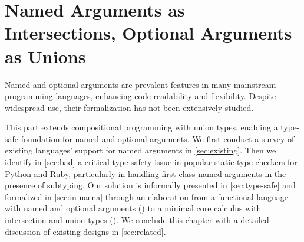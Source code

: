 \chapter{Named Arguments as Intersections, Optional Arguments as Unions} \label{ch:arguments}

Named and optional arguments are prevalent features in many mainstream
programming languages, enhancing code readability and flexibility. Despite
widespread use, their formalization has not been extensively studied.

This part extends compositional programming with union types, enabling a
type-safe foundation for named and optional arguments. We first conduct a survey
of existing languages' support for named arguments in \autoref{sec:existing}.
Then we identify in \autoref{sec:bad} a critical type-safety issue in popular
static type checkers for Python and Ruby, particularly in handling first-class
named arguments in the presence of subtyping. Our solution is informally
presented in \autoref{sec:type-safe} and formalized in \autoref{sec:iu-uaena}
through an elaboration from a functional language with named and optional
arguments (\uaena) to a minimal core calculus with intersection and union types
(\lambdaiu). We conclude this chapter with a detailed discussion of existing
designs in \autoref{sec:related}.






